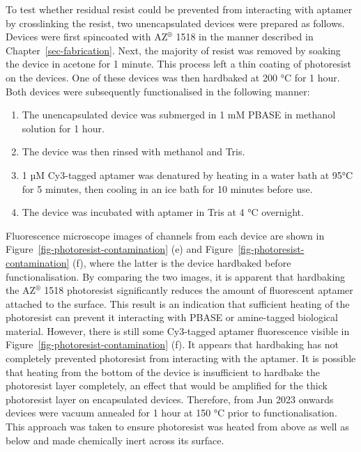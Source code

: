\documentclass[
  a4paper,
]{scrbook}
\begin{document}
To test whether residual resist could be prevented from interacting with
aptamer by crosslinking the resist, two unencapsulated devices were
prepared as follows. Devices were first spincoated with AZ\(^\circledR\)
1518 in the manner described in Chapter~\ref{sec-fabrication}. Next, the
majority of resist was removed by soaking the device in acetone for 1
minute. This process left a thin coating of photoresist on the devices.
One of these devices was then hardbaked at 200 °C for 1 hour. Both
devices were subsequently functionalised in the following manner:

\begin{enumerate}
\def\labelenumi{\arabic{enumi}.}
\item
  The unencapsulated device was submerged in 1 mM PBASE in methanol
  solution for 1 hour.
\item
  The device was then rinsed with methanol and Tris.
\item
  1 µM Cy3-tagged aptamer was denatured by heating in a water bath at
  95°C for 5 minutes, then cooling in an ice bath for 10 minutes before
  use.
\item
  The device was incubated with aptamer in Tris at 4 °C overnight.
\end{enumerate}

Fluorescence microscope images of channels from each device are shown in
Figure~\ref{fig-photoresist-contamination} (e) and
Figure~\ref{fig-photoresist-contamination} (f), where the latter is the
device hardbaked before functionalisation. By comparing the two images,
it is apparent that hardbaking the AZ\(^\circledR\) 1518 photoresist
significantly reduces the amount of fluorescent aptamer attached to the
surface. This result is an indication that sufficient heating of the
photoresist can prevent it interacting with PBASE or amine-tagged
biological material. However, there is still some Cy3-tagged aptamer
fluorescence visible in Figure~\ref{fig-photoresist-contamination} (f).
It appears that hardbaking has not completely prevented photoresist from
interacting with the aptamer. It is possible that heating from the
bottom of the device is insufficient to hardbake the photoresist layer
completely, an effect that would be amplified for the thick photoresist
layer on encapsulated devices. Therefore, from Jun 2023 onwards devices
were vacuum annealed for 1 hour at 150 °C prior to functionalisation.
This approach was taken to ensure photoresist was heated from above as
well as below and made chemically inert across its surface.
\end{document}
